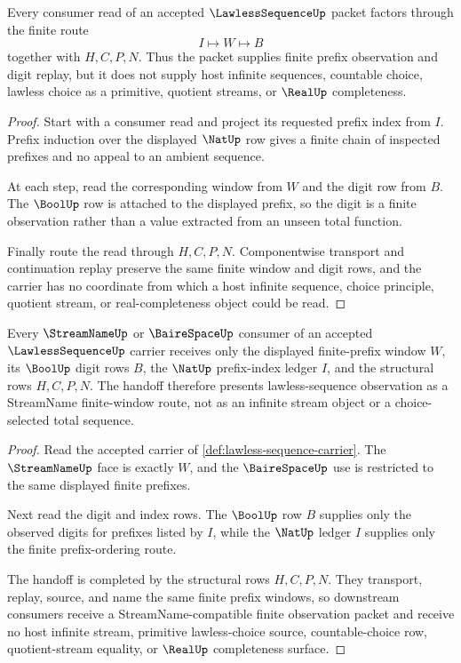 \begin{theorem}
\label{thm:lawless-sequence-finite-window-scope}
Every consumer read of an accepted $\LawlessSequenceUp$ packet factors through the finite route
$$
I\longmapsto W\longmapsto B
$$
together with $H,C,P,N$. Thus the packet supplies finite prefix observation and digit replay, but it does not supply host infinite sequences, countable choice, lawless choice as a primitive, quotient streams, or $\RealUp$ completeness.
\end{theorem}
\begin{proof}
Start with a consumer read and project its requested prefix index from $I$. Prefix induction over the displayed $\NatUp$ row gives a finite chain of inspected prefixes and no appeal to an ambient sequence.

At each step, read the corresponding window from $W$ and the digit row from $B$. The $\BoolUp$ row is attached to the displayed prefix, so the digit is a finite observation rather than a value extracted from an unseen total function.

Finally route the read through $H,C,P,N$. Componentwise transport and continuation replay preserve the same finite window and digit rows, and the carrier has no coordinate from which a host infinite sequence, choice principle, quotient stream, or real-completeness object could be read.
\end{proof}

\begin{theorem}
\label{thm:lawless-sequence-streamname-handoff}
Every $\StreamNameUp$ or $\BaireSpaceUp$ consumer of an accepted $\LawlessSequenceUp$ carrier receives only the displayed finite-prefix window $W$, its $\BoolUp$ digit rows $B$, the $\NatUp$ prefix-index ledger $I$, and the structural rows $H,C,P,N$. The handoff therefore presents lawless-sequence observation as a StreamName finite-window route, not as an infinite stream object or a choice-selected total sequence.
\end{theorem}
\begin{proof}
Read the accepted carrier of \autoref{def:lawless-sequence-carrier}. The $\StreamNameUp$ face is exactly $W$, and the $\BaireSpaceUp$ use is restricted to the same displayed finite prefixes.

Next read the digit and index rows. The $\BoolUp$ row $B$ supplies only the observed digits for prefixes listed by $I$, while the $\NatUp$ ledger $I$ supplies only the finite prefix-ordering route.

The handoff is completed by the structural rows $H,C,P,N$. They transport, replay, source, and name the same finite prefix windows, so downstream consumers receive a StreamName-compatible finite observation packet and receive no host infinite stream, primitive lawless-choice source, countable-choice row, quotient-stream equality, or $\RealUp$ completeness surface.
\end{proof}

